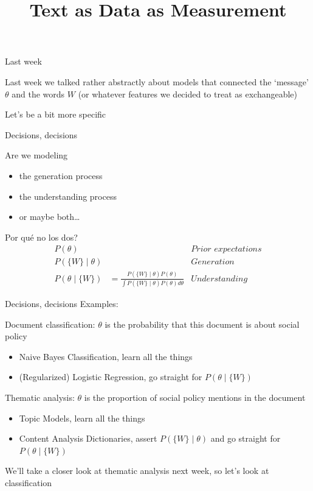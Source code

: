 \documentclass{hertieteaching}
\title{Text as Data as Measurement}
\begin{document}
\maketitle


\begin{frame}{Last week}

Last week we talked rather abstractly about models that connected the `message' $\theta$ and the words $W$ (or whatever features we decided to treat as exchangeable)

Let's be a bit more specific

\end{frame}


\begin{frame}{Decisions, decisions}

Are we modeling 
\begin{itemize}
  \item the generation process
  \item the understanding process
  \item or maybe both\ldots
\end{itemize}

\pause

Por qué no los dos?
\begin{align*}
P(\theta) && \textit{Prior expectations}\\
P(\{W\} \mid \theta) && \textit{Generation} \\
P(\theta \mid \{W\}) & = \frac{P(\{W\} \mid \theta)P(\theta)}{\int P(\{W\} \mid \theta) P(\theta) d\theta} & \textit{Understanding}
\end{align*}

\end{frame}
\begin{frame}{Decisions, decisions}
Examples:

Document classification: $\theta$ is the probability that this document is about social policy
\begin{itemize}
  \item Naive Bayes Classification, learn all the things
  \item (Regularized) Logistic Regression, go straight for $P(\theta \mid \{W\})$ 
\end{itemize}

Thematic analysis: $\theta$ is the proportion of social policy mentions in the document
\begin{itemize}
  \item Topic Models, learn all the things
  \item Content Analysis Dictionaries, assert $P(\{W\} \mid \theta)$ and go straight for $P(\theta \mid \{W\})$
\end{itemize}

We'll take a closer look at thematic analysis next week, so let's look at classification

\end{frame}
\end{document}
